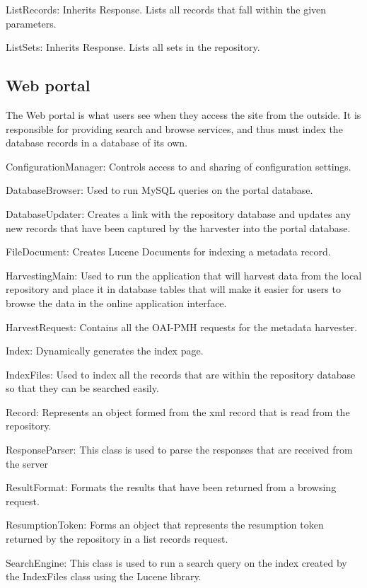 \documentclass[a4paper,11pt]{article}
\begin{document}
ListRecords: Inherits Response. Lists all records that fall within the given parameters.

ListSets: Inherits Response. Lists all sets in the repository.

\subsection{Web portal}

The Web portal is what users see when they access the site from the outside. It is responsible for providing search and browse services, and thus must index the database records in a database of its own.

ConfigurationManager: Controls access to and sharing of configuration settings.

DatabaseBrowser: Used to run MySQL queries on the portal database.

DatabaseUpdater: Creates a link with the repository database and updates any new records that have been captured by the harvester into the portal database.

FileDocument: Creates Lucene Documents for indexing a metadata record.

HarvestingMain: Used to run the application that will harvest data from the local repository and place it in database tables that will make it easier for users to browse the data in the online application interface.

HarvestRequest: Contains all the OAI-PMH requests for the metadata harvester.

Index: Dynamically generates the index page.

IndexFiles: Used to index all the records that are within the repository database so that they can be searched easily.

Record: Represents an object formed from the xml record that is read from the repository.

ResponseParser: This class is used to parse the responses that are received from the server

ResultFormat: Formats the results that have been returned from a browsing request.

ResumptionToken: Forms an object that represents the resumption token returned by the repository in a list records request.

SearchEngine: This class is used to run a search query on the index created by the IndexFiles class using the Lucene library.

\appendix
\end{document}
